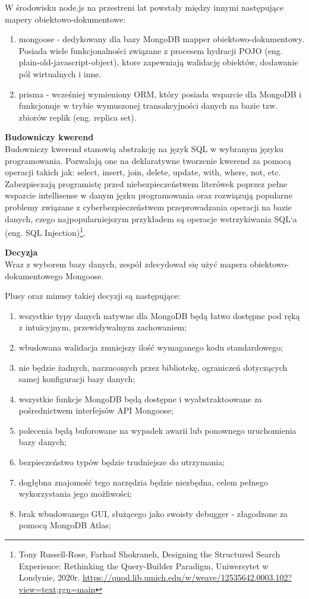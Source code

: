 \documentclass[12pt, a4paper, twoside, openany]{book}
\begin{document}
W środowisku node.js na przestreni lat powstały między innymi następujące mapery obiektowo-dokumentowe:
\begin{enumerate}[label=--]
    \item mongoose - dedykowany dla bazy MongoDB mapper obiektowo-dokumentowy. Posiada wiele funkcjonalności związane z procesem hydracji POJO (eng. plain-old-javascript-object), ktore zapewniają walidację obiektów, dodawanie pól wirtualnych i inne.
    \item prisma - wcześniej wymieniony ORM, który posiada wsparcie dla MongoDB i funkcjonuje w trybie wymuszonej transakcyjności danych na bazie tzw. zbiorów replik (eng. replica set).
\end{enumerate}

\textbf{Budowniczy kwerend\\}
Budowniczy kwerend stanowią abstrakcję na język SQL w wybranym języku programowania.
Pozwalają one na deklaratywne tworzenie kwerend za pomocą operacji takich jak: select, insert, join, delete, update, with, where, not, etc.
Zabezpieczają programistę przed niebezpieczeństwem literówek poprzez pełne wsparcie intellisense w danym jęzku programowania oraz rozwiązują popularne problemy związane z cyberbezpieczeństwem przeprowadzania operacji na bazie danych, czego najpopularniejszym przykładem są operacje wstrzykiwania SQL`a (eng. SQL Injection)\footnote{Tony Russell-Rose, Farhad Shokraneh, Designing the Structured Search Experience: Rethinking the Query-Builder Paradigm, Uniwersytet w Londynie, 2020r. \url{https://quod.lib.umich.edu/w/weave/12535642.0003.102?view=text;rgn=main}}.

\textbf{Decyzja\\}
Wraz z wyborem bazy danych, zespół zdecydował się użyć mapera obiektowo-dokumentowego Mongoose.

Plusy oraz minusy takiej decyzji są następujące:
\begin{enumerate}[label=--]
    \item wszystkie typy danych natywne dla MongoDB będą łatwo dostępne pod ręką z intuicyjnym, przewidywalnym zachowaniem;
    \item wbudowana walidacja zmniejszy ilość wymaganego kodu standardowego;
    \item nie będzie żadnych, narzuconych przez bibliotekę, ograniczeń dotyczących samej konfiguracji bazy danych;
    \item wszystkie funkcje MongoDB będą dostępne i wyabstraktoowane za pośrednictwem interfejsów API Mongoose;
    \item polecenia będą buforowane na wypadek awarii lub ponownego uruchomienia bazy danych;
    \item bezpieczeństwo typów będzie trudniejsze do utrzymania;
    \item dogłębna znajomość tego narzędzia będzie niezbędna, celem pełnego wykorzystania jego możliwości;
    \item brak wbudowanego GUI, służącego jako swoisty debugger - złagodzone za pomocą MongoDB Atlas;
\end{enumerate}
\end{document}
